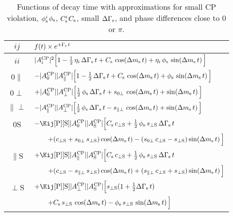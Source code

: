 \begin{table}[tbp]
  \centering
  \caption{Functions of decay time with approximations for small CP violation, $\phi_\text{s}^{i}$\textequiv$\phi_\text{s}$, $C_\text{s}^{i}$\textequiv$C_\text{s}$,
           small $\Delta\Gamma_\text{s}$, and phase differences close to 0 or $\pi$.}
  \label{tab:timeFunctionsApproxEqual}
  \renewcommand{\arraystretch}{1.7}
  \begin{tabular}{cl}
    \hline
    $ij$  &  $f(t) \times e^{+\Gamma_\text{s}\,t}$  \\
    \hline
    $ii$
      &  $|A_{i}^{\text{CP}}|^2 \Big[
                     1 - \tfrac{1}{2}\,\eta_i\,\Delta\Gamma_\text{s}\,t
                     + C_\text{s}\,\cos\!\left(\Delta m_\text{s}\, t\right) + \eta_i\,\phi_\text{s}\,\sin\!\left(\Delta m_\text{s}\, t\right)
                   \Big]$  \\
    0$\parallel$
      &  $-|A_{\text{0}}^{\text{CP}}||A_{\parallel}^{\text{CP}}| \Big[
                                 1 - \tfrac{1}{2}\,\Delta\Gamma_\text{s}\,t
                                 + C_\text{s}\, \cos\!\left(\Delta m_\text{s}\, t\right) + \phi_\text{s}\, \sin\!\left(\Delta m_\text{s}\, t\right)
                               \Big]$  \\
    0$\perp$
      &  $+|A_{\text{0}}^{\text{CP}}||A_{\perp}^{\text{CP}}| \Big[
                                  \tfrac{1}{2}\,\phi_\text{s}\,\Delta\Gamma_\text{s}\,t
                                  + s_{\text{0}\perp}\, \cos\!\left(\Delta m_\text{s}\, t\right) + \sin\!\left(\Delta m_\text{s}\, t\right)
                                \Big]$  \\
    $\parallel\perp$
      &  $-|A_{\parallel}^{\text{CP}}||A_{\perp}^{\text{CP}}| \Big[
                                 \tfrac{1}{2}\,\phi_\text{s}\,\Delta\Gamma_\text{s}\,t
                                 - s_{\parallel\perp}\, \cos\!\left(\Delta m_\text{s}\, t\right) + \sin\!\left(\Delta m_\text{s}\, t\right)
                               \Big]$  \\
    0S
      &  $-\CSP\magzeroAv\magSAv \Big[
                                   \Cs\,\cperpS
                                   + \tfrac{1}{2}\,\phis\,\sperpS\,\DGs\,t$ \\
      &  $\qquad                   + (c_{\perp\text{S}} + s_{\text{0}\perp}\,s_{\perp\text{S}}) \cos\!\left(\Delta m_\text{s}\, t\right)
                                   - (s_{\text{0}\perp}\,c_{\perp\text{S}} - s_{\perp\text{S}})\sin\!\left(\Delta m_\text{s}\, t\right)
                                 \Big]$  \\
    $\parallel$S
      &  $+\CSP\magparAv\magSAv \Big[
                                  \Cs\,\cperpS
                                  + \tfrac{1}{2}\,\phis\,\sperpS\,\DGs\,t$ \\
      &  $\qquad                  + (c_{\perp\text{S}} - s_{\parallel\perp}\,s_{\perp\text{S}})\cos\!\left(\Delta m_\text{s}\, t\right)
                                  + (s_{\parallel\perp}\,c_{\perp\text{S}} + s_{\perp\text{S}})\sin\!\left(\Delta m_\text{s}\, t\right)
                                \Big]$  \\
    $\perp$S
      &  $+\CSP\magperpAv\magSAv \Big[
                                   \sperpS (1 + \tfrac{1}{2}\DGs\,t)$ \\
      &  $\qquad                   + C_\text{s}\,s_{\perp\text{S}}\,\cos\!\left(\Delta m_\text{s}\, t\right)
                                   - \phi_\text{s}\,s_{\perp\text{S}}\,\sin\!\left(\Delta m_\text{s}\, t\right)
                                 \Big]$  \\
    \hline
  \end{tabular}
\end{table}

